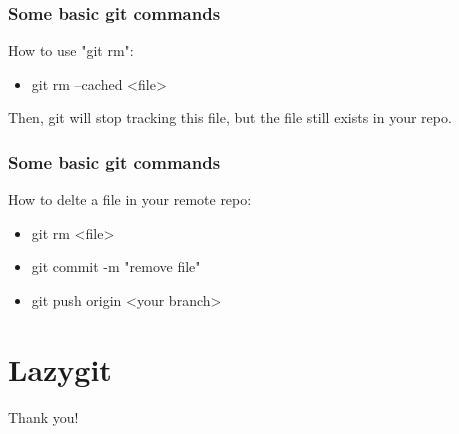 \documentclass[aspectratio=169]{beamer}
\begin{document}
\begin{frame}
  \frametitle{Some basic git commands}
  How to use "git rm":
  \begin{itemize}
    \item git rm --cached <file>
  \end{itemize}
  Then, git will stop tracking this file, but the file still exists in your repo.
\end{frame}

\begin{frame}
  \frametitle{Some basic git commands}
  How to delte a file in your remote repo:
  \begin{itemize}
    \item git rm <file>
    \item git commit -m "remove file"
    \item git push origin <your branch>
  \end{itemize}
\end{frame}




\section{Lazygit}


\begin{frame}
  \Huge{\centerline{Thank you!}}
\end{frame}
\end{document}
